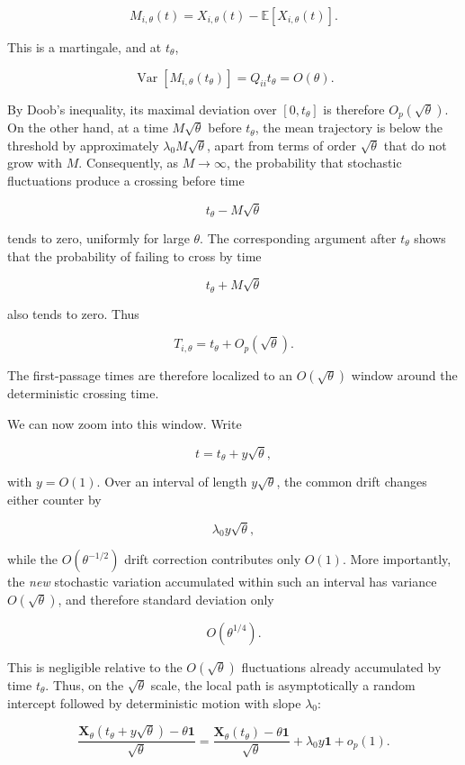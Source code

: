 \documentclass[
  man,
  floatsintext,
  longtable,
  a4paper,
  nolmodern,
  notxfonts,
  notimes,
  colorlinks=true,linkcolor=blue,citecolor=blue,urlcolor=blue]{apa7}
\begin{document}
\[
M_{i,\theta}(t)
=
X_{i,\theta}(t)-\mathbb E[X_{i,\theta}(t)].
\]

This is a martingale, and at \(t_\theta\),

\[
\operatorname{Var}\!\left[M_{i,\theta}(t_\theta)\right]
=
Q_{ii}t_\theta
=
O(\theta).
\]

By Doob's inequality, its maximal deviation over \([0,t_\theta]\) is
therefore \(O_p(\sqrt{\theta})\). On the other hand, at a time
\(M\sqrt{\theta}\) before \(t_\theta\), the mean trajectory is below the
threshold by approximately \(\lambda_0M\sqrt{\theta}\), apart from terms
of order \(\sqrt{\theta}\) that do not grow with \(M\). Consequently, as
\(M\to\infty\), the probability that stochastic fluctuations produce a
crossing before time

\[
t_\theta-M\sqrt{\theta}
\]

tends to zero, uniformly for large \(\theta\). The corresponding
argument after \(t_\theta\) shows that the probability of failing to
cross by time

\[
t_\theta+M\sqrt{\theta}
\]

also tends to zero. Thus

\[
T_{i,\theta}
=
t_\theta+O_p(\sqrt{\theta}).
\]

The first-passage times are therefore localized to an
\(O(\sqrt{\theta})\) window around the deterministic crossing time.

We can now zoom into this window. Write

\[
t=t_\theta+y\sqrt{\theta},
\]

with \(y=O(1)\). Over an interval of length \(y\sqrt{\theta}\), the
common drift changes either counter by

\[
\lambda_0y\sqrt{\theta},
\]

while the \(O(\theta^{-1/2})\) drift correction contributes only
\(O(1)\). More importantly, the \emph{new} stochastic variation
accumulated within such an interval has variance \(O(\sqrt{\theta})\),
and therefore standard deviation only

\[
O(\theta^{1/4}).
\]

This is negligible relative to the \(O(\sqrt{\theta})\) fluctuations
already accumulated by time \(t_\theta\). Thus, on the \(\sqrt{\theta}\)
scale, the local path is asymptotically a random intercept followed by
deterministic motion with slope \(\lambda_0\):

\[
\frac{
\mathbf X_\theta(t_\theta+y\sqrt{\theta})
-\theta\mathbf 1
}{
\sqrt{\theta}
}
=
\frac{
\mathbf X_\theta(t_\theta)-\theta\mathbf 1
}{
\sqrt{\theta}
}
+
\lambda_0y\mathbf 1
+
o_p(1).
\]
\end{document}
